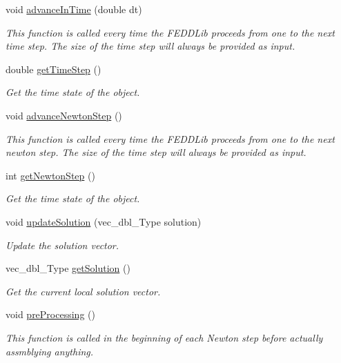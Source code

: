 \begin{DoxyCompactItemize}
void \hyperlink{classFEDD_1_1AssembleFE_aa291b30d2a3f78705b2a7722a1a04d96}{advance\+In\+Time} (double dt)
\begin{DoxyCompactList}\small\item\em This function is called every time the F\+E\+D\+D\+Lib proceeds from one to the next time step. The size of the time step will always be provided as input. \end{DoxyCompactList}\item 
double \hyperlink{classFEDD_1_1AssembleFE_a960875e7038a3f20e4507bc86f17247f}{get\+Time\+Step} ()
\begin{DoxyCompactList}\small\item\em Get the time state of the object. \end{DoxyCompactList}\item 
void \hyperlink{classFEDD_1_1AssembleFE_afbb44e574eb47e8e97436e9125f373a0}{advance\+Newton\+Step} ()
\begin{DoxyCompactList}\small\item\em This function is called every time the F\+E\+D\+D\+Lib proceeds from one to the next newton step. The size of the time step will always be provided as input. \end{DoxyCompactList}\item 
int \hyperlink{classFEDD_1_1AssembleFE_af11bbb371048522d35ecb1f4f2584a8a}{get\+Newton\+Step} ()
\begin{DoxyCompactList}\small\item\em Get the time state of the object. \end{DoxyCompactList}\item 
void \hyperlink{classFEDD_1_1AssembleFE_a5303adf0752fe27d9ff47ae8a39c1da4}{update\+Solution} (vec\+\_\+dbl\+\_\+\+Type solution)
\begin{DoxyCompactList}\small\item\em Update the solution vector. \end{DoxyCompactList}\item 
vec\+\_\+dbl\+\_\+\+Type \hyperlink{classFEDD_1_1AssembleFE_a33e83a1eb6656a74609dfbfaf3fae474}{get\+Solution} ()
\begin{DoxyCompactList}\small\item\em Get the current local solution vector. \end{DoxyCompactList}\item 
void \hyperlink{classFEDD_1_1AssembleFE_a7bfb3f6b49f102b0856551d62c8c8a9f}{pre\+Processing} ()
\begin{DoxyCompactList}\small\item\em This function is called in the beginning of each Newton step before actually assmblying anything. \end{DoxyCompactList}\item 

\end{DoxyCompactItemize}
